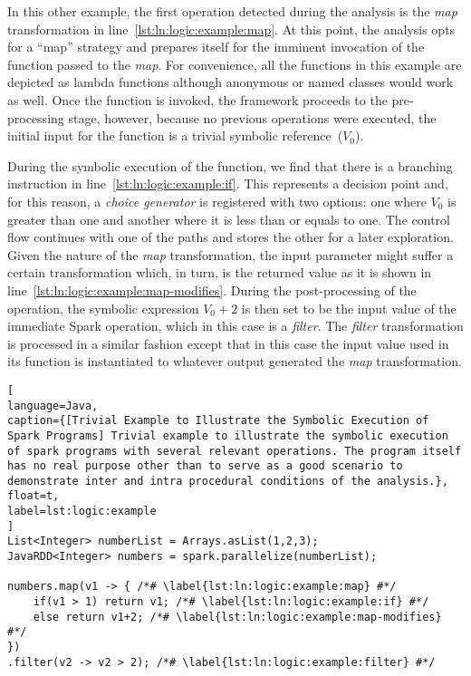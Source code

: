 In this other example, the first operation detected during the analysis is the \textit{map} transformation in line~\ref{lst:ln:logic:example:map}. At this point, the analysis opts for a ``map'' strategy and prepares itself for the imminent invocation of the function passed to the \textit{map}. For convenience, all the functions in this example are depicted as lambda functions although anonymous or named classes would work as well. Once the function is invoked, the framework proceeds to the pre-processing stage, however, because no previous operations were executed, the initial input for the function is a trivial symbolic reference~($V_0$).

During the symbolic execution of the function, we find that there is a branching instruction in line~\ref{lst:ln:logic:example:if}. This represents a decision point and, for this reason, a \textit{choice generator} is registered with two options: one where $V_0$ is greater than one and another where it is less than or equals to one. The control flow continues with one of the paths and stores the other for a later exploration. Given the nature of the \textit{map} transformation, the input parameter might suffer a certain transformation which, in turn, is the returned value as it is shown in line~\ref{lst:ln:logic:example:map-modifies}. During the post-processing of the operation, the symbolic expression $V_0 + 2$ is then set to be the input value of the immediate Spark operation, which in this case is a \textit{filter}. The \textit{filter} transformation is processed in a similar fashion except that in this case the input value used in its function is instantiated to whatever output generated the \textit{map} transformation. 

\begin{lstlisting}[
language=Java,
caption={[Trivial Example to Illustrate the Symbolic Execution of Spark Programs] Trivial example to illustrate the symbolic execution of spark programs with several relevant operations. The program itself has no real purpose other than to serve as a good scenario to demonstrate inter and intra procedural conditions of the analysis.},
float=t,
label=lst:logic:example
]
List<Integer> numberList = Arrays.asList(1,2,3);
JavaRDD<Integer> numbers = spark.parallelize(numberList);

numbers.map(v1 -> { /*# \label{lst:ln:logic:example:map} #*/
	if(v1 > 1) return v1; /*# \label{lst:ln:logic:example:if} #*/
	else return v1+2; /*# \label{lst:ln:logic:example:map-modifies} #*/
})
.filter(v2 -> v2 > 2); /*# \label{lst:ln:logic:example:filter} #*/
\end{lstlisting}


